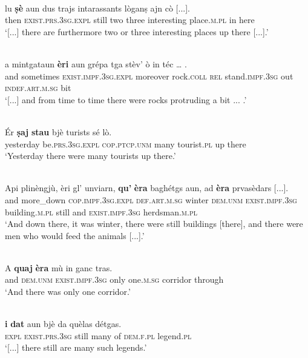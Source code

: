 \ea
\label{ex:exist.essar2}
\\
\gll [...] lu \textbf{ṣè} aun dus trajs intarassants lòganṣ ajn cò [...].\\
{} then \textsc{exist.prs.3sg.expl} still two three interesting place.\textsc{m.pl} in here\\
\glt `[...] there are furthermore two or three interesting places up there [...].'
\z

\ea
\label{ex:exist.essar3}
\\
\gll   [...] a mintgataun \textbf{èri} aun grépa tga stèv’ ò in téc … . \\
{} and sometimes  \textsc{exist.impf.3sg.expl} moreover rock.\textsc{coll} \textsc{rel}  stand.\textsc{impf.3sg}  out \textsc{indef.art.m.sg} bit\\
\glt `[...] and from time to time there were rocks protruding a bit ... .'
\z

\ea
\label{ex:exist.essar4}
\\
\gll Ér \textbf{ṣaj} \textbf{stau} bjè turists sé lò.\\
yesterday be.\textsc{prs.3sg.expl} \textsc{cop.ptcp.unm} many tourist.\textsc{pl} up there\\
\glt `Yesterday there were many tourists up there.'
\z

\ea
\label{ex:exist.essar5}
\\
\gll    Api plinèngjù, èri gl' unviarn, \textbf{qu’} \textbf{èra} baghétgs aun, ad \textbf{èra} prvasèdars [...].\\
and more\_down \textsc{cop.impf.3sg.expl} \textsc{def.art.m.sg} winter \textsc{dem.unm} \textsc{exist.impf.3sg} building.\textsc{m.pl} still and \textsc{exist.impf.3sg} herdsman.\textsc{m.pl} \\
\glt `And down there, it was winter, there were still buildings [there], and there were men who would feed the animals [...].'
\z

\ea
\label{ex:exist.essar6}
\\
\gll    A \textbf{quaj} \textbf{èra} mù in ganc tras.\\
and \textsc{dem.unm} \textsc{exist.impf.3sg} only one.\textsc{m.sg} corridor through\\
\glt `And there was only one corridor.'
\z

\ea
\label{ex:exist.da1}
\\
\gll  [...] \textbf{i} \textbf{dat} aun bjè da quèlas détgas.  \\
{} \textsc{expl} \textsc{exist.prs.3sg} still many of  \textsc{dem.f.pl} legend.\textsc{pl}\\
\glt `[...] there still are many such legends.'
\z

